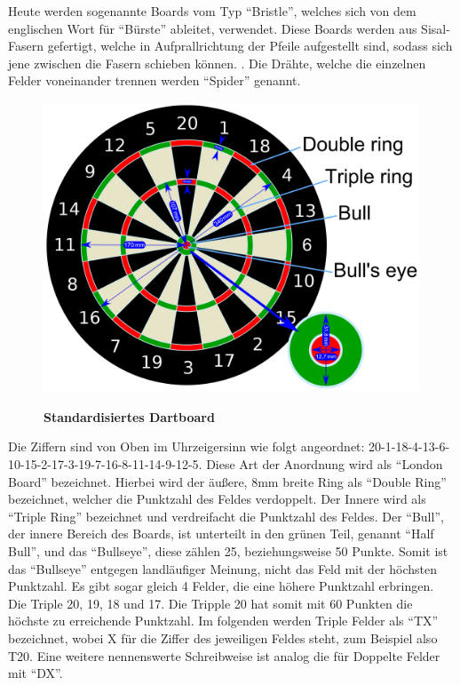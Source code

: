 Heute werden sogenannte Boards vom Typ "`Bristle"', welches sich von dem englischen Wort für "`Bürste"' ableitet, verwendet. Diese Boards werden aus Sisal-Fasern gefertigt, welche in Aufprallrichtung der Pfeile aufgestellt sind, sodass sich jene zwischen die Fasern schieben können. \autocite[6]{dph2015}. Die Drähte, welche die einzelnen Felder voneinander trennen werden "`Spider"' genannt.
\begin{figure}
\includegraphics[width=\textwidth]{media/Dartboard_Abmessungen}\\
\caption{\textbf{Standardisiertes Dartboard\cite{Board2016}}
}
\label{Fig:dartboard}
\end{figure}

Die Ziffern sind von Oben im Uhrzeigersinn wie folgt angeordnet:  20-1-18-4-13-6-10-15-2-17-3-19-7-16-8-11-14-9-12-5. Diese Art der Anordnung wird als "`London Board"' bezeichnet. Hierbei wird der äußere, 8mm breite Ring als "`Double Ring"' bezeichnet, welcher die Punktzahl des Feldes verdoppelt. Der Innere wird als "`Triple Ring"' bezeichnet und verdreifacht die Punktzahl des Feldes. Der "`Bull"', der innere Bereich des Boards, ist unterteilt in den grünen Teil, genannt "`Half Bull"', und das "`Bullseye"', diese zählen 25, beziehungsweise 50 Punkte. 
Somit ist das "`Bullseye"' entgegen landläufiger Meinung, nicht das Feld mit der höchsten Punktzahl. Es gibt sogar gleich 4 Felder, die eine höhere Punktzahl erbringen. Die Triple 20, 19, 18 und 17. Die Tripple 20 hat somit mit 60 Punkten die höchste zu erreichende Punktzahl. Im folgenden werden Triple Felder als "`TX"' bezeichnet, wobei X für die Ziffer des jeweiligen Feldes steht, zum Beispiel also T20. Eine weitere nennenswerte Schreibweise ist analog die für Doppelte Felder mit "`DX"'. 

